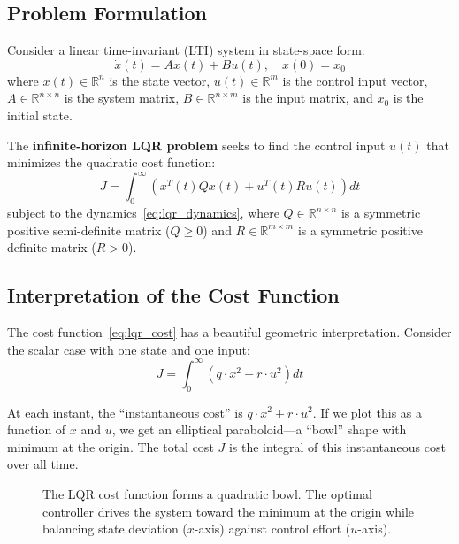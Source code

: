 \subsection{Problem Formulation}

Consider a linear time-invariant (LTI) system in state-space form:
\begin{equation}
\dot{x}(t) = Ax(t) + Bu(t), \quad x(0) = x_0
\label{eq:lqr_dynamics}
\end{equation}
where $x(t) \in \mathbb{R}^n$ is the state vector, $u(t) \in \mathbb{R}^m$ is the control input vector, $A \in \mathbb{R}^{n \times n}$ is the system matrix, $B \in \mathbb{R}^{n \times m}$ is the input matrix, and $x_0$ is the initial state.

The \textbf{infinite-horizon LQR problem} seeks to find the control input $u(t)$ that minimizes the quadratic cost function:
\begin{equation}
\boxed{J = \int_0^\infty \left( x^T(t) Q x(t) + u^T(t) R u(t) \right) dt}
\label{eq:lqr_cost}
\end{equation}
subject to the dynamics~\eqref{eq:lqr_dynamics}, where $Q \in \mathbb{R}^{n \times n}$ is a symmetric positive semi-definite matrix ($Q \geq 0$) and $R \in \mathbb{R}^{m \times m}$ is a symmetric positive definite matrix ($R > 0$).

\subsection{Interpretation of the Cost Function}

The cost function~\eqref{eq:lqr_cost} has a beautiful geometric interpretation. Consider the scalar case with one state and one input:
\begin{equation}
J = \int_0^\infty \left( q \cdot x^2 + r \cdot u^2 \right) dt
\end{equation}

At each instant, the ``instantaneous cost'' is $q \cdot x^2 + r \cdot u^2$. If we plot this as a function of $x$ and $u$, we get an elliptical paraboloid---a ``bowl'' shape with minimum at the origin. The total cost $J$ is the integral of this instantaneous cost over all time.

\begin{figure}[H]
\centering
{}
\caption{The LQR cost function forms a quadratic bowl. The optimal controller drives the system toward the minimum at the origin while balancing state deviation ($x$-axis) against control effort ($u$-axis).}
\label{fig:cost_bowl}
\end{figure}

